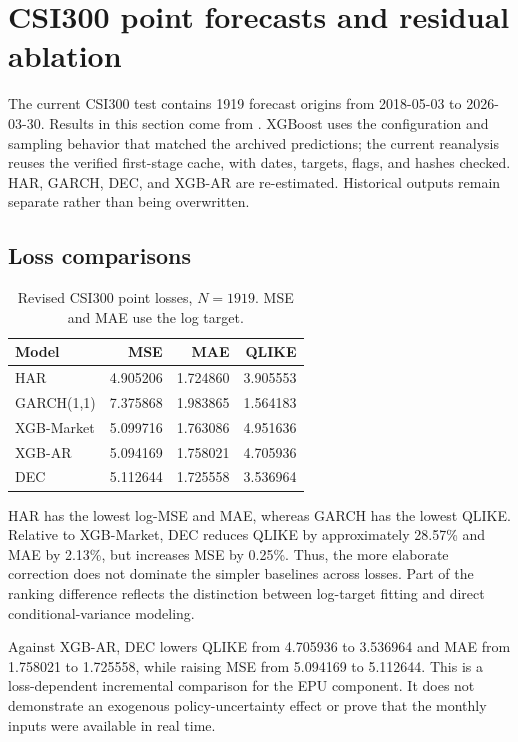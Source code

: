 \section{CSI300 point forecasts and residual ablation}
\label{sec:point}
The current CSI300 test contains 1919 forecast origins from 2018-05-03 to 2026-03-30. Results in this section come from . XGBoost uses the configuration and sampling behavior that matched the archived predictions; the current reanalysis reuses the verified first-stage cache, with dates, targets, flags, and hashes checked. HAR, GARCH, DEC, and XGB-AR are re-estimated. Historical outputs remain separate rather than being overwritten.

\subsection{Loss comparisons}
\begin{table}[htbp]\centering
\caption{Revised CSI300 point losses, $N=1919$. MSE and MAE use the log target.}
\label{tab:forecast_metrics}
\begin{tabular}{lrrr}\toprule Model & MSE & MAE & QLIKE\\\midrule
HAR & 4.905206 & 1.724860 & 3.905553\\
GARCH(1,1) & 7.375868 & 1.983865 & 1.564183\\
XGB-Market & 5.099716 & 1.763086 & 4.951636\\
XGB-AR & 5.094169 & 1.758021 & 4.705936\\
DEC & 5.112644 & 1.725558 & 3.536964\\\bottomrule
\end{tabular}
\end{table}

HAR has the lowest log-MSE and MAE, whereas GARCH has the lowest QLIKE. Relative to XGB-Market, DEC reduces QLIKE by approximately 28.57\% and MAE by 2.13\%, but increases MSE by 0.25\%. Thus, the more elaborate correction does not dominate the simpler baselines across losses. Part of the ranking difference reflects the distinction between log-target fitting and direct conditional-variance modeling.

Against XGB-AR, DEC lowers QLIKE from 4.705936 to 3.536964 and MAE from 1.758021 to 1.725558, while raising MSE from 5.094169 to 5.112644. This is a loss-dependent incremental comparison for the EPU component. It does not demonstrate an exogenous policy-uncertainty effect or prove that the monthly inputs were available in real time.

